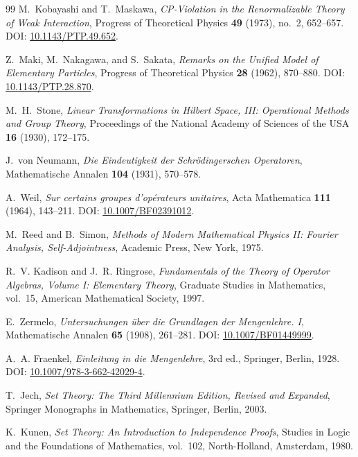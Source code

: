 \begin{thebibliography}{99}
M.~Kobayashi and T.~Maskawa,
\emph{CP-Violation in the Renormalizable Theory of Weak Interaction},
Progress of Theoretical Physics \textbf{49} (1973), no.~2, 652--657.
\newblock DOI: \href{https://doi.org/10.1143/PTP.49.652}{10.1143/PTP.49.652}.

Z.~Maki, M.~Nakagawa, and S.~Sakata,
\emph{Remarks on the Unified Model of Elementary Particles},
Progress of Theoretical Physics \textbf{28} (1962), 870--880.
\newblock DOI: \href{https://doi.org/10.1143/PTP.28.870}{10.1143/PTP.28.870}.

M.~H.~Stone,
\emph{Linear Transformations in Hilbert Space, III: Operational Methods and Group Theory},
Proceedings of the National Academy of Sciences of the USA \textbf{16} (1930), 172--175.

J.~von Neumann,
\emph{Die Eindeutigkeit der Schr\"odingerschen Operatoren},
Mathematische Annalen \textbf{104} (1931), 570--578.

A.~Weil,
\emph{Sur certains groupes d'op\'erateurs unitaires},
Acta Mathematica \textbf{111} (1964), 143--211.
\newblock DOI: \href{https://doi.org/10.1007/BF02391012}{10.1007/BF02391012}.

M.~Reed and B.~Simon,
\emph{Methods of Modern Mathematical Physics II: Fourier Analysis, Self-Adjointness},
Academic Press, New York, 1975.

R.~V. Kadison and J.~R. Ringrose,
\emph{Fundamentals of the Theory of Operator Algebras, Volume I: Elementary Theory},
Graduate Studies in Mathematics, vol.~15,
American Mathematical Society, 1997.

E.~Zermelo,
\emph{Untersuchungen \"uber die Grundlagen der Mengenlehre. I},
Mathematische Annalen \textbf{65} (1908), 261--281.
\newblock DOI: \href{https://doi.org/10.1007/BF01449999}{10.1007/BF01449999}.

A.~A. Fraenkel,
\emph{Einleitung in die Mengenlehre},
3rd ed., Springer, Berlin, 1928.
\newblock DOI: \href{https://doi.org/10.1007/978-3-662-42029-4}{10.1007/978-3-662-42029-4}.

T.~Jech,
\emph{Set Theory: The Third Millennium Edition, Revised and Expanded},
Springer Monographs in Mathematics,
Springer, Berlin, 2003.

K.~Kunen,
\emph{Set Theory: An Introduction to Independence Proofs},
Studies in Logic and the Foundations of Mathematics, vol.~102,
North-Holland, Amsterdam, 1980.


\end{thebibliography}
